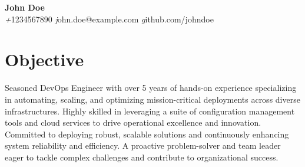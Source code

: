 \documentclass[a4paper,10pt]{article}
\begin{document}
\pagestyle{empty} %

\newcommand{\sectionline}{
  \noindent\makebox[\linewidth]{\rule{\paperwidth}{0.4pt}}
}

\begin{center}
    {\Huge \textbf{John Doe}}\\
    \textit +1234567890 \quad \textit john.doe@example.com \quad 
     \quad \textit github.com/johndoe
\end{center}

\sectionline

\section*{Objective}
Seasoned DevOps Engineer with over 5 years of hands-on experience specializing in automating, scaling, and optimizing mission-critical deployments across diverse infrastructures. Highly skilled in leveraging a suite of configuration management tools and cloud services to drive operational excellence and innovation. Committed to deploying robust, scalable solutions and continuously enhancing system reliability and efficiency. A proactive problem-solver and team leader eager to tackle complex challenges and contribute to organizational success.

\end{document}
